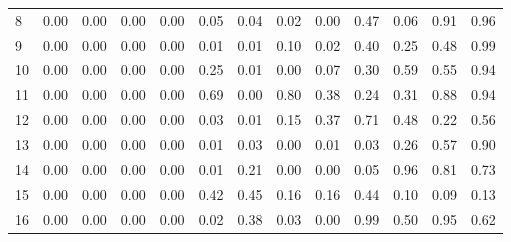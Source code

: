 \documentclass[12pt]{article}%
\begin{document}
\begin{table}[htp!]
\begin{adjustbox}{max width=\textwidth}
\begin{tabular}{ l c c c c c c c c c c c c }
 8 &               0.00 &               0.00 &               0.00 &               0.00 &               0.05 &               0.04 &               0.02 &               0.00 &               0.47 &               0.06 &               0.91 &               0.96 \\
 9 &               0.00 &               0.00 &               0.00 &               0.00 &               0.01 &               0.01 &               0.10 &               0.02 &               0.40 &               0.25 &               0.48 &               0.99 \\
10 &               0.00 &               0.00 &               0.00 &               0.00 &               0.25 &               0.01 &               0.00 &               0.07 &               0.30 &               0.59 &               0.55 &               0.94 \\
11 &               0.00 &               0.00 &               0.00 &               0.00 &               0.69 &               0.00 &               0.80 &               0.38 &               0.24 &               0.31 &               0.88 &               0.94 \\
12 &               0.00 &               0.00 &               0.00 &               0.00 &               0.03 &               0.01 &               0.15 &               0.37 &               0.71 &               0.48 &               0.22 &               0.56 \\
13 &               0.00 &               0.00 &               0.00 &               0.00 &               0.01 &               0.03 &               0.00 &               0.01 &               0.03 &               0.26 &               0.57 &               0.90 \\
14 &               0.00 &               0.00 &               0.00 &               0.00 &               0.01 &               0.21 &               0.00 &               0.00 &               0.05 &               0.96 &               0.81 &               0.73 \\
15 &               0.00 &               0.00 &               0.00 &               0.00 &               0.42 &               0.45 &               0.16 &               0.16 &               0.44 &               0.10 &               0.09 &               0.13 \\
16 &               0.00 &               0.00 &               0.00 &               0.00 &               0.02 &               0.38 &               0.03 &               0.00 &               0.99 &               0.50 &               0.95 &               0.62 \\

\end{tabular}
\end{adjustbox}
\end{table}
\end{document}
